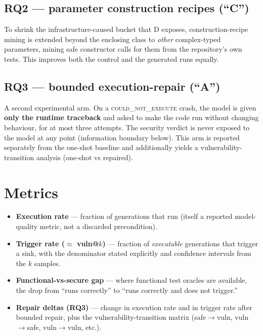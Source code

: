 \documentclass[11pt]{article}
\begin{document}
\subsection{RQ2 --- parameter construction recipes (``C'')}
To shrink the infrastructure-caused bucket that D exposes, construction-recipe
mining is extended beyond the enclosing class to \emph{other} complex-typed
parameters, mining safe constructor calls for them from the repository's own
tests. This improves both the control and the generated runs equally.

\subsection{RQ3 --- bounded execution-repair (``A'')}
A second experimental arm. On a \textsc{could\_not\_execute} crash, the model
is given \textbf{only the runtime traceback} and asked to make the code run
without changing behaviour, for at most three attempts. The security verdict
is never exposed to the model at any point (information boundary below). This
arm is reported separately from the one-shot baseline and additionally yields
a vulnerability-transition analysis (one-shot vs repaired).

\begin{center}
\end{center}

\section{Metrics}

\begin{itemize}[leftmargin=1.4em,itemsep=1pt,topsep=2pt]
  \item \textbf{Execution rate} --- fraction of generations that run
  (itself a reported model-quality metric, not a discarded precondition).
  \item \textbf{Trigger rate ($\approx$ vuln@$k$)} --- fraction of
  \emph{executable} generations that trigger a sink, with the denominator
  stated explicitly and confidence intervals from the $k$ samples.
  \item \textbf{Functional-vs-secure gap} --- where functional test
  oracles are available, the drop from ``runs correctly'' to ``runs
  correctly and does not trigger.''
  \item \textbf{Repair deltas (RQ3)} --- change in execution rate and in
  trigger rate after bounded repair, plus the vulnerability-transition
  matrix (safe$\to$vuln, vuln$\to$safe, vuln$\to$vuln, etc.).
\end{itemize}
\end{document}
